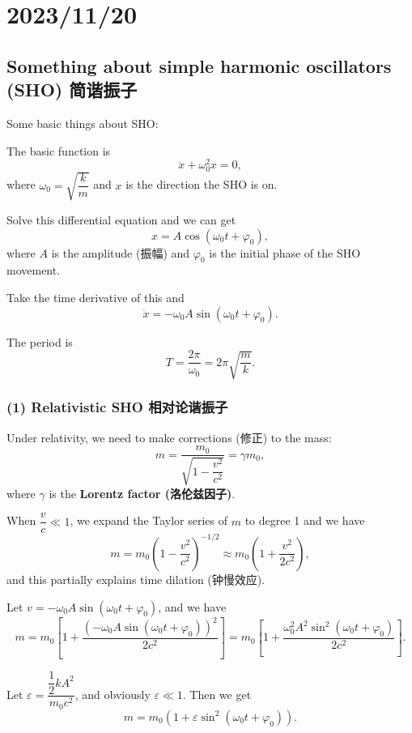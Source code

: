 \chapter{2023/11/20}\label{20231120}

\section{Something about simple harmonic oscillators (SHO)
简谐振子}\label{something-about-simple-harmonic-oscillators-sho-ux8c10ux632fux5b50}

Some basic things about SHO:

The basic function is \[\ddot x + \omega_0^2 x = 0,\] where
\(\omega_0 = \sqrt{\dfrac{k}{m}}\) and \(x\) is the direction the SHO is
on.

Solve this differential equation and we can get
\[x = A \cos (\omega_0 t + \varphi_0),\] where \(A\) is the amplitude
(振幅) and \(\varphi_0\) is the initial phase of the SHO movement.

Take the time derivative of this and
\[\dot x = - \omega_0 A \sin (\omega_0 t + \varphi_0).\]

The period is
\[T = \dfrac{2 \pi}{\omega_0} = 2 \pi \sqrt{\dfrac{m}{k}}.\]

\subsection*{(1) Relativistic SHO
相对论谐振子}\label{relativistic-sho-ux76f8ux5bf9ux8bbaux8c10ux632fux5b50}

Under relativity, we need to make corrections (修正) to the mass:
\[m = \dfrac{m_0}{\sqrt{1 - \dfrac{v^2}{c^2}}} = \gamma m_0,\] where
\(\gamma\) is the \textbf{Lorentz factor (洛伦兹因子)}.

When \(\dfrac{v}{c} \ll 1\), we expand the Taylor series of \(m\) to
degree 1 and we have
\[m = m_0 \left(1 - \dfrac{v^2}{c^2}\right)^{- 1/2} \approx m_0 \left(1 + \dfrac{v^2}{2c^2}\right),\]
and this partially explains time dilation (钟慢效应).

Let \(v = - \omega_0 A \sin (\omega_0 t + \varphi_0)\), and we have
\[m = m_0 \left[ 1 + \dfrac{ \left( - \omega_0 A \sin (\omega_0 t + \varphi_0) \right) ^2}{2c^2} \right] = m_0 \left[ 1 + \dfrac{ \omega_0^2 A^2 \sin^2 (\omega_0 t + \varphi_0)}{2c^2} \right].\]

Let \(\varepsilon = \dfrac{\dfrac{1}{2} k A^2}{m_0 c^2}\), and obviously
\(\varepsilon \ll 1\). Then we get
\[m = m_0 \left(1 + \varepsilon \sin^2 (\omega_0 t + \varphi_0) \right).\]


